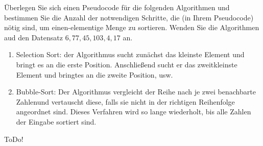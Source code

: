 
\begin{exercise}

Überlegen Sie sich einen Pseudocode für die folgenden Algorithmen und bestimmen Sie die Anzahl der notwendigen Schritte, die (in Ihrem Pseudocode) nötig sind, um einen-elementige Menge zu sortieren.
Wenden Sie die Algorithmen aud den Datensatz $6, 77, 45, 103, 4, 17$ an.

\begin{enumerate}[label = (\alph*)]

    \item Selection Sort:
    der Algorithmus sucht zunächst das kleinste Element und bringt es an die erste Position.
    Anschließend sucht er das zweitkleinste Element und bringtes an die zweite Position, usw.
    
    \item Bubble-Sort:
    Der Algorithmus vergleicht der Reihe nach je zwei benachbarte Zahlenund vertauscht diese, falls sie nicht in der richtigen Reihenfolge angeordnet sind.
    Dieses Verfahren wird so lange wiederholt, bis alle Zahlen der Eingabe sortiert sind.
    
\end{enumerate}

\end{exercise}


\begin{solution}

ToDo!

\end{solution}

